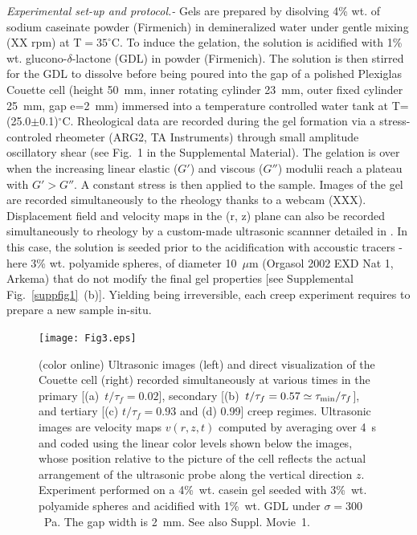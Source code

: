 \documentclass[twocolumn,superscriptaddress,showpacs,preprintnumbers,amsmath,amssymb,prl]{revtex4}
\newcommand\taum{\tau_{\rm min}}
\begin{document}
\textit{Experimental set-up and protocol.-} Gels are prepared by disolving 4\% wt. of sodium caseinate powder (Firmenich) in demineralized water under gentle mixing (XX rpm) at T$=35^{\circ}$C. To induce the gelation, the solution is acidified with 1\% wt. glucono-$\delta$-lactone (GDL) in powder (Firmenich). The solution is then stirred for the GDL to dissolve before being poured into the gap of a polished Plexiglas Couette cell (height 50~mm, inner rotating cylinder 23~mm, outer fixed cylinder 25~mm, gap e=2~mm) immersed into a temperature controlled water tank at T=(25.0$\pm$0.1)$^{\circ}$C. Rheological data are recorded during the gel formation  via a stress-controled rheometer (ARG2, TA Instruments) through small amplitude oscillatory shear (see Fig.~1 in the Supplemental Material). The gelation is over when the increasing linear elastic ($G'$) and viscous ($G''$) modulii reach a plateau with $G'>G''$. A constant stress is then applied to the sample. Images of the gel are recorded simultaneously to the rheology thanks to a webcam (XXX). Displacement field and velocity maps in the (r, z) plane can also be recorded simultaneously to rheology by a custom-made ultrasonic scannner detailed in \cite{Gallot:2013}. In this case, the solution is seeded prior to the acidification with accoustic tracers -here 3\% wt. polyamide spheres, of diameter 10~$\mu$m (Orgasol 2002 EXD Nat 1, Arkema) that do not modify the final gel properties [see Supplemental Fig.~\ref{suppfig1}~(b)]. Yielding being irreversible, each creep experiment requires to prepare a new sample in-situ.  

\begin{figure}[t]
\centering
\texttt{[image: Fig3.eps]}
\caption{(color online) Ultrasonic images (left) and direct visualization of the Couette cell (right) recorded simultaneously at various times in the primary [(a)~$t/\tau_f=0.02$], secondary [(b)~$t/\tau_f=0.57\simeq\taum/\tau_f$], and tertiary  [(c) $t/\tau_f=0.93$ and (d) 0.99] creep regimes. Ultrasonic images are velocity maps $v(r,z,t)$ computed by averaging over 4~s and coded using the linear color levels shown below the images, whose position relative to the picture of the cell reflects the actual arrangement of the ultrasonic probe along the vertical direction $z$. Experiment performed on a 4\%~wt. casein gel seeded with 3\%~wt. polyamide spheres and acidified with 1\%~wt. GDL under $\sigma=300$~Pa. The gap width is 2~mm. See also Suppl. Movie~1.
\label{fig3}}
\end{figure} 
\end{document}
